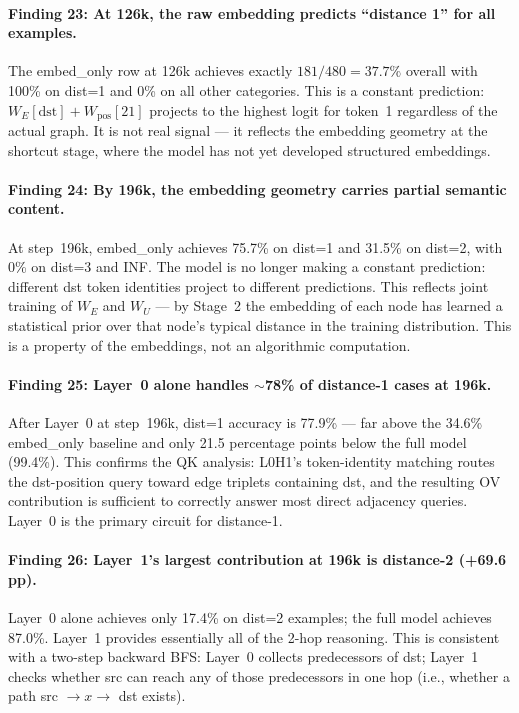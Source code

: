 \documentclass[11pt, a4paper]{article}
\begin{document}
\paragraph{Finding 23: At 126k, the raw embedding predicts ``distance 1''
for all examples.}
The embed\_only row at 126k achieves exactly $181/480 = 37.7\%$ overall with
100\% on dist=1 and 0\% on all other categories.  This is a constant
prediction: $W_E[\text{dst}] + W_{\text{pos}}[21]$ projects to the highest
logit for token~1 regardless of the actual graph.  It is not real signal ---
it reflects the embedding geometry at the shortcut stage, where the model has
not yet developed structured embeddings.

\paragraph{Finding 24: By 196k, the embedding geometry carries partial
semantic content.}
At step~196k, embed\_only achieves 75.7\% on dist=1 and 31.5\% on dist=2,
with 0\% on dist=3 and INF.  The model is no longer making a constant
prediction: different dst token identities project to different predictions.
This reflects joint training of $W_E$ and $W_U$ --- by Stage~2 the embedding
of each node has learned a statistical prior over that node's typical distance
in the training distribution.  This is a property of the embeddings, not an
algorithmic computation.

\paragraph{Finding 25: Layer~0 alone handles $\sim$78\% of distance-1 cases
at 196k.}
After Layer~0 at step~196k, dist=1 accuracy is 77.9\%  --- far above the
34.6\% embed\_only baseline and only 21.5 percentage points below the full
model (99.4\%).  This confirms the QK analysis: L0H1's token-identity matching
routes the dst-position query toward edge triplets containing dst, and the
resulting OV contribution is sufficient to correctly answer most direct
adjacency queries.  Layer~0 is the primary circuit for distance-1.

\paragraph{Finding 26: Layer~1's largest contribution at 196k is distance-2
(+69.6 pp).}
Layer~0 alone achieves only 17.4\% on dist=2 examples; the full model
achieves 87.0\%.  Layer~1 provides essentially all of the 2-hop reasoning.
This is consistent with a two-step backward BFS: Layer~0 collects predecessors
of dst; Layer~1 checks whether src can reach any of those predecessors in one
hop (i.e., whether a path src $\to x \to$ dst exists).
\end{document}
